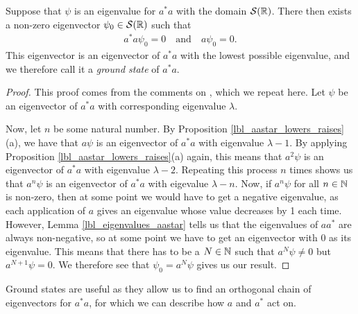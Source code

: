 \begin{proposition} \label{lbl_aastar_ground_state}
  Suppose that $\psi$ is an eigenvalue for $a^*a$ with the domain $\mathcal{S}(\mathbb{R})$. There then exists a non-zero eigenvector $\psi_0 \in \mathcal{S}(\mathbb{R})$ such that
  \begin{align*}
    a^*a\psi_0 = 0 \quad \text{and} \quad
    a \psi_0 = 0.
  \end{align*}
  This eigenvector is an eigenvector of $a^*a$ with the lowest possible eigenvalue, and we therefore call it a {\emph{ground state}} of $a^*a$.
\end{proposition}
\begin{proof}
  This proof comes from the comments on {\cite[p.230]{Hall2013}}, which we repeat here. Let $\psi$ be an eigenvector of $a^*a$ with corresponding eigenvalue $\lambda$.

  \medskip

  Now, let $n$ be some natural number. By Proposition \eqref{lbl_aastar_lowers_raises}(a), we have that $a\psi$ is an eigenvector of $a^*a$ with eigenvalue $\lambda - 1$. By applying Proposition \eqref{lbl_aastar_lowers_raises}(a) again, this means that $a^2 \psi$ is an eigenvector of $a^*a$ with eigenvalue $\lambda - 2$. Repeating this process $n$ times shows us that $a^n \psi$ is an eigenvector of $a^*a$ with eigevalue $\lambda - n$. Now, if $a^n \psi$ for all $n \in \mathbb{N}$ is non-zero, then at some point we would have to get a negative eigenvalue, as each application of $a$ gives an eigenvalue whose value decreases by 1 each time. However, Lemma \eqref{lbl_eigenvalues_aastar} tells us that the eigenvalues of $aa^*$ are always non-negative, so at some point we have to get an eigenvector with 0 as its eigenvalue. This means that there has to be a $N \in \mathbb{N}$ such that $a^N \psi \neq 0$ but $a^{N+1} \psi = 0$. We therefore see that $\psi_0 = a^{N}\psi$ gives us our result.
\end{proof}
Ground states are useful as they allow us to find an orthogonal chain of eigenvectors for $a^*a$, for which we can describe how $a$ and $a^*$ act on.

